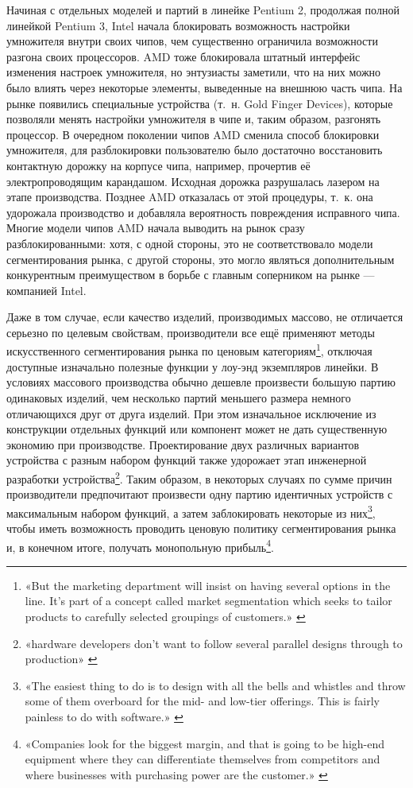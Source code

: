\documentclass{article}
\begin{document}
Начиная с отдельных моделей и партий в линейке Pentium 2, продолжая полной линейкой Pentium 3, Intel начала блокировать возможность настройки умножителя внутри своих чипов, чем существенно ограничила возможности разгона своих процессоров. AMD тоже блокировала штатный интерфейс изменения настроек умножителя, но энтузиасты заметили, что на них можно было влиять через некоторые элементы, выведенные на внешнюю часть чипа. На рынке появились специальные устройства (т.~н. Gold Finger Devices), которые позволяли менять настройки умножителя в чипе и, таким образом, разгонять процессор. В очередном поколении чипов AMD сменила способ блокировки умножителя, для разблокировки пользователю было достаточно восстановить контактную дорожку на корпусе чипа, например, прочертив её электропроводящим карандашом. Исходная дорожка разрушалась лазером на этапе производства. Позднее AMD отказалась от этой процедуры, т.~к. она удорожала производство и добавляла вероятность повреждения исправного чипа. Многие модели чипов AMD начала выводить на рынок сразу разблокированными: хотя, с одной стороны, это не соответствовало модели сегментирования рынка, с другой стороны, это могло являться дополнительным конкурентным преимуществом в борьбе с главным соперником на рынке — компанией Intel.

Даже в том случае, если качество изделий, производимых массово, не отличается серьезно по целевым свойствам, производители все ещё применяют методы искусственного сегментирования рынка по ценовым категориям\footnote{«But the marketing department will insist on having several options in the line. It’s part of a concept called market segmentation which seeks to tailor products to carefully selected groupings of customers.» \cite{hackdayUnlockableFeatures2017}}, отключая доступные изначально полезные функции у лоу-энд экземпляров линейки. В условиях массового производства обычно дешевле произвести большую партию одинаковых изделий, чем несколько партий меньшего размера немного отличающихся друг от друга изделий. При этом изначальное исключение из конструкции отдельных функций или компонент может не дать существенную экономию при производстве. Проектирование двух различных вариантов устройства с разным набором функций также удорожает этап инженерной разработки устройства\footnote{«hardware developers don’t want to follow several parallel designs through to production» \cite{hackdayUnlockableFeatures2017}}. Таким образом, в некоторых случаях по сумме причин производители предпочитают произвести одну партию идентичных устройств с максимальным набором функций, а затем заблокировать некоторые из них\footnote{«The easiest thing to do is to design with all the bells and whistles and throw some of them overboard for the mid- and low-tier offerings. This is fairly painless to do with software.» \cite{hackdayUnlockableFeatures2017}}, чтобы иметь возможность проводить ценовую политику сегментирования рынка и, в конечном итоге, получать монопольную прибыль\footnote{«Companies look for the biggest margin, and that is going to be high-end equipment where they can differentiate themselves from competitors and where businesses with purchasing power are the customer.» \cite{hackdayUnlockableFeatures2017}}.
\end{document}
